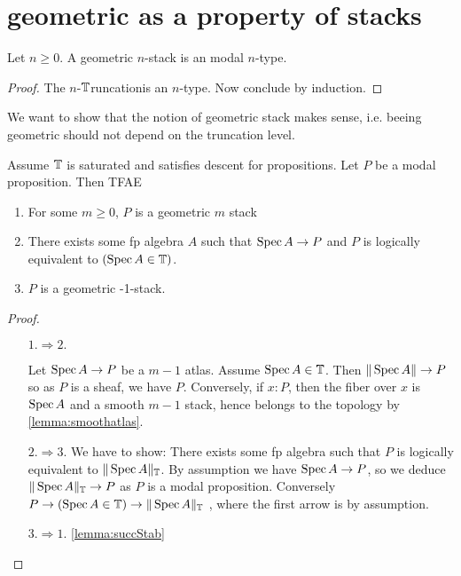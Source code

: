 \documentclass{article}
\newcommand{\truncation}{$\bT$runcation}
\newcommand{\red}[1]{{\color{red} #1}}
\begin{document}
\section{geometric as a property of stacks}


\begin{lemma}
    Let $n \ge 0$. A geometric $n$-stack is an modal $n$-type.
\end{lemma}
\begin{proof}
     The $n$-\truncation is an $n$-type. Now conclude by induction.
\end{proof}
We want to show that the notion of geometric stack makes sense, i.e. beeing geometric should not depend on the truncation level. 

\begin{lemma}{\label{lemma:prop0stacks}}
     Assume $\mathbb{T}$ is saturated and satisfies descent for propositions. Let $P$ be a modal proposition. Then TFAE 
     \begin{enumerate}
         \item For some $m \ge 0$, $P$ is a geometric $m$ stack 
         \item There exists some fp algebra $A$ such that $\operatorname{Spec} A \to P$ and $P$ is logically equivalent to $(\operatorname{Spec} A \in \mathbb{T})$.
         \item $P$ is a geometric -1-stack.
     \end{enumerate}
     
     
\end{lemma}
\begin{proof}
\
    \begin{itemize}
        \item[$1.\Rightarrow 2.$]
    
     Let $\operatorname{Spec} A \to P$ be a $m-1$ atlas. Assume $\operatorname{Spec} A \in \mathbb{T}$. Then $\|\operatorname{Spec} A\| \to P$ so as $P$ is a sheaf, we have $P$. Conversely, if $x : P$, then the fiber over $x$ is $\operatorname{Spec} A$ and a smooth $m-1$ stack, hence belongs to the topology by \ref{lemma:smoothatlas}. 
     \item[$2. \Rightarrow 3.$]
        \red{We have to show: There exists some fp algebra such that $P$ is logically equivalent to $\|\operatorname{Spec} A\|_{\mathbb{T}}$. }        
        By assumption we have $\operatorname{Spec} A \to P$, so we deduce $\|\operatorname{Spec} A\|_{\mathbb{T}} \to P$ as $P$ is a modal proposition. Conversely $P \to (\operatorname{Spec} A \in \mathbb{T}) \to \|\operatorname{Spec} A\|_{\mathbb{T}}$ , where the first arrow is by assumption.
        \item [$3. \Rightarrow 1.$] \ref{lemma:succStab}
     \end{itemize}
\end{proof}
\end{document}
